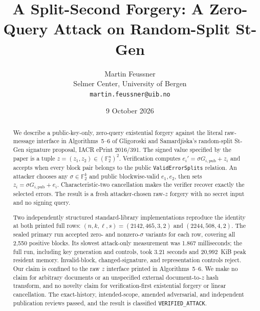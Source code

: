 \documentclass[10pt,a4paper]{article}
\title{\bfseries A Split-Second Forgery: A Zero-Query Attack on Random-Split St-Gen}
\author{Martin Feussner\\
\small Selmer Center, University of Bergen\\
\small \texttt{martin.feussner@uib.no}}
\date{9 October 2026}
\newcommand{\F}{\mathbb{F}}
\begin{document}
\maketitle

\noindent{}

\begin{abstract}
We describe a public-key-only, zero-query existential forgery against the
literal raw-message interface in Algorithms~5--6 of Gligoroski and
Samardjiska's random-split St-Gen signature proposal, IACR ePrint 2016/391.
The signed value specified by the paper is a tuple
$z=(z_1,z_2)\in(\F_2^n)^2$.  Verification computes
$e_i'=\sigma G_{i,\mathrm{pub}}+z_i$ and accepts when every block pair belongs
to the public \texttt{ValidErrorSplits} relation.  An attacker chooses any
$\sigma\in\F_2^k$ and public blockwise-valid $e_1,e_2$, then sets
$z_i=\sigma G_{i,\mathrm{pub}}+e_i$.  Characteristic-two cancellation makes
the verifier recover exactly the selected errors.  The result is a fresh
attacker-chosen raw-$z$ forgery with no secret input and no signing query.

Two independently structured standard-library implementations reproduce the
identity at both printed full rows: $(n,k,\ell,s)=(2142,465,3,2)$ and
$(2244,508,4,2)$.  The sealed primary run accepted zero- and nonzero-$\sigma$
variants for each row, covering all 2,550 positive blocks.  Its slowest
attack-only measurement was 1.867 milliseconds; the full run, including key
generation and controls, took 3.21 seconds and 20,992~KiB peak resident
memory.  Invalid-block, changed-signature, and representation controls reject.
Our claim is confined to the raw $z$ interface printed in Algorithms~5--6.
We make no claim for arbitrary documents or an unspecified external
document-to-$z$ hash transform, and no novelty claim for verification-first
existential forgery or linear cancellation.  The exact-history, intended-scope,
amended adversarial, and independent publication reviews passed, and the result
is classified \texttt{VERIFIED\_ATTACK}.
\end{abstract}
\end{document}
